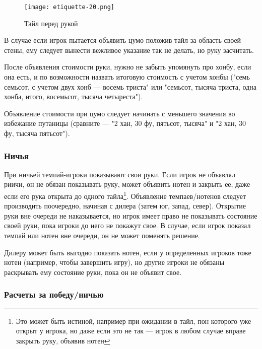 \begin{figure}[H]
	\centering
	\texttt{[image: etiquette-20.png]}
	\caption{Тайл перед рукой}
\end{figure}

В случае если игрок пытается объявить цумо положив тайл за область своей стены, ему следует вынести вежливое указание так не делать, но руку засчитать. 

После объявления стоимости руки, нужно не забыть упомянуть про хонбу, если она есть, и по возможности назвать итоговую стоимость с учетом хонбы ("семь семьсот, с учетом двух хонб --- восемь триста" или "семьсот, тысяча триста, одна хонба, итого, восемьсот, тысяча четыреста").

Объявление стоимости при цумо следует начинать с меньшего значения во избежание путаницы (сравните --- "2 хан, 30 фу, пятьсот, тысяча" и "2 хан, 30 фу, тысяча пятьсот").

\subsubsection{Ничья}

При ничьей темпай-игроки показывают свои руки. Если игрок не объявлял риичи, он не обязан показывать руку, может объявить нотен и закрыть ее, даже если его рука открыта до одного тайла\footnote{Это может быть истиной, например при ожидании в тайл, пон которого уже открыт у игрока, но даже если это не так --- игрок в любом случае вправе закрыть руку, объявив нотен}. Объявление темпаев/нотенов следует производить поочередно, начиная с дилера (затем юг, запад, север). Открытие руки вне очереди не наказывается, но игрок имеет право не показывать состояние своей руки, пока игроки до него не покажут свое. В случае, если игрок показал темпай или нотен вне очереди, он не может поменять решение.

Дилеру может быть выгодно показать нотен, если у определенных игроков тоже нотен (например, чтобы завершить игру), но другие игроки не обязаны раскрывать ему состояние руки, пока он не объявит свое.

\subsubsection{Расчеты за победу/ничью}

